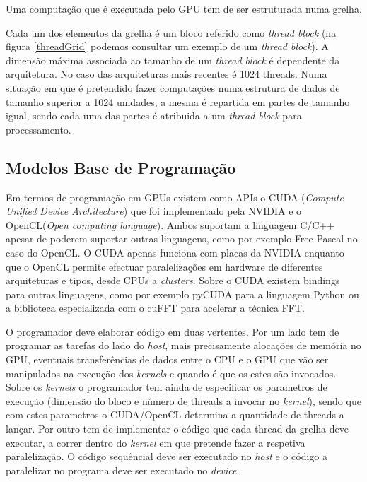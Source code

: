 Uma computação que é executada pelo GPU tem de ser estruturada numa grelha. \par Cada um dos elementos da grelha é um bloco referido como \textit{thread block} (na figura \ref{threadGrid} podemos consultar um exemplo de um \textit{thread block}). A dimensão máxima associada ao tamanho de um \textit{thread block} é dependente da arquitetura. No caso das arquiteturas mais recentes é 1024 threads. Numa situação em que é pretendido fazer computações numa estrutura de dados de tamanho superior a 1024 unidades, a mesma é repartida em partes de tamanho igual, sendo cada uma das partes é atribuida a um \textit{thread block} para processamento. 
 
\subsection{Modelos Base de Programação} 
\label{progGPU}
Em termos de programação em GPUs existem como APIs o CUDA (\textit{Compute Unified Device Architecture})\cite{cudaZone} que foi implementado pela NVIDIA e o OpenCL(\textit{Open computing language})\cite{openCL}. Ambos suportam a linguagem C/C++ apesar de poderem suportar outras linguagens, como por exemplo Free Pascal no caso do OpenCL. O CUDA apenas funciona com placas da NVIDIA enquanto que o OpenCL permite efectuar paralelizações em hardware de diferentes arquiteturas e tipos, desde CPUs a \textit{clusters}. Sobre o CUDA existem bindings para outras linguagens, como por exemplo pyCUDA para a linguagem Python ou a biblioteca especializada com o cuFFT\cite{nvidiaFFT} para acelerar a técnica FFT.  \cite{openclProf}

 O programador deve elaborar código em duas vertentes. Por um lado tem de programar as tarefas do lado do \textit{host}, mais precisamente alocações de memória no GPU, eventuais transferências de dados entre o CPU e o GPU que vão ser manipulados na execução dos \textit{kernels} e quando é que os estes são invocados. Sobre os \textit{kernels} o programador tem ainda de especificar os parametros de execução (dimensão do bloco e número de threads a invocar no \textit{kernel}), sendo que com estes parametros o CUDA/OpenCL determina a quantidade de threads a lançar. Por outro tem de implementar o código que cada thread da grelha deve executar, a correr dentro do \textit{kernel} em que pretende fazer a respetiva paralelização. O código sequêncial deve ser executado no \textit{host} e o código a paralelizar no programa deve ser executado no \textit{device}.

